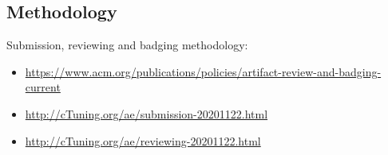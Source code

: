 %






\subsection{Methodology}

Submission, reviewing and badging methodology:

\begin{itemize}
  \item \url{https://www.acm.org/publications/policies/artifact-review-and-badging-current}
  \item \url{http://cTuning.org/ae/submission-20201122.html}
  \item \url{http://cTuning.org/ae/reviewing-20201122.html}
\end{itemize}
